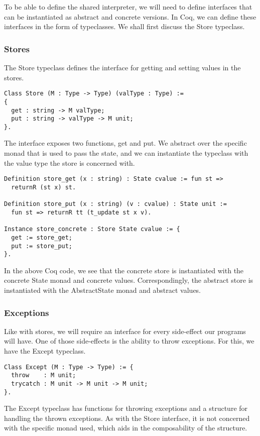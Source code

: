 To be able to define the shared interpreter, we will need to define interfaces
that can be instantiated as abstract and concrete versions. In Coq, we can
define these interfaces in the form of typeclasses. We shall first discuss the
Store typeclass.

\subsubsection{Stores}
The Store typeclass defines the interface for getting and setting values in the
stores. 
\begin{verbatim}
Class Store (M : Type -> Type) (valType : Type) :=
{
  get : string -> M valType;
  put : string -> valType -> M unit;
}.
\end{verbatim}

The interface exposes two functions, get and put. We abstract over the specific
monad that is used to pass the state, and we can instantiate the typeclass with
the value type the store is concerned with.

\begin{verbatim}
Definition store_get (x : string) : State cvalue := fun st =>
  returnR (st x) st.

Definition store_put (x : string) (v : cvalue) : State unit := 
  fun st => returnR tt (t_update st x v).

Instance store_concrete : Store State cvalue := {
  get := store_get;
  put := store_put;
}.
\end{verbatim}

In the above Coq code, we see that the concrete store is instantiated with the
concrete State monad and concrete values. Correspondingly, the abstract store
is instantiated with the AbstractState monad and abstract values.

\subsubsection{Exceptions}
Like with stores, we will require an interface for every side-effect our
programs will have. One of those side-effects is the ability to throw
exceptions. For this, we have the Except typeclass.

\begin{verbatim}
Class Except (M : Type -> Type) := {
  throw    : M unit;
  trycatch : M unit -> M unit -> M unit;
}.
\end{verbatim}

The Except typeclass has functions for throwing exceptions and a structure for
handling the thrown exceptions. As with the Store interface, it is not
concerned with the specific monad used, which aids in the composability of the
structure. 

